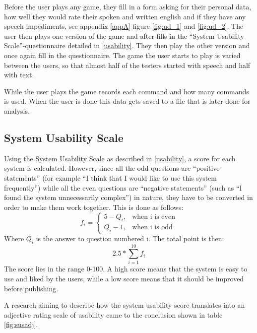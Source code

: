 Before the user plays any game, they fill in a form asking for their personal data, how well they would rate their spoken and written english and if they have any speech impediments, see appendix \ref{appA} figure \ref{fig:ud_1} and \ref{fig:ud_2}. The user then plays one version of the game and after fills in the ``System Usability Scale''-questionnaire detailed in \ref{usability}. They then play the other version and once again fill in the questionnaire. The game the user starts to play is varied between the users, so that almost half of the testers started with speech and half with text.

While the user plays the game records each command and how many commands is used. When the user is done this data gets saved to a file that is later done for analysis.

\subsection{System Usability Scale} \label{sec:sus}
Using the System Usability Scale as described in \ref{usability}, a score for each system is calculated. However, since all the odd questions are ``positive statements'' (for example ``I think that I would like to use this system frequently'') while all the even questions are ``negative statements'' (such as ``I found the system unnecessarily complex'') in nature, they have to be converted in order to make them work together. This is done as follows: 
\begin{equation} \label{eq:convert}
	    f_{i} = 
	\begin{cases} 
	    5 - Q_{i}, & \text{when i is even}\\
	    Q_{i} - 1, & \text{when i is odd}
	\end{cases}
\end{equation}
Where \(Q_{i} \) is the answer to question numbered i. The total point is then: 
\begin{equation} \label{eq:sum}
	2.5 * \displaystyle \sum_{i=1}^{10} f_{i} 
\end{equation}
The score lies in the range 0-100. A high score means that the system is easy to use and liked by the users, while a low score means that it should be improved before publishing. \citep{Broo}

A research aiming to describe how the system usability score translates into an adjective rating scale of usability came to the conclusion shown in table \ref{fig:susadj}. \citep[page 118]{Aaron}

